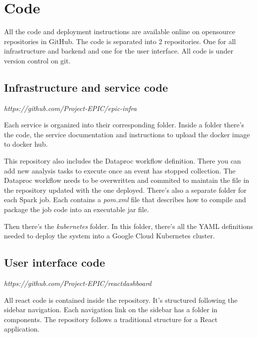 \chapter{Code}	%

All the code and deployment instructions are available online on opensource repositories in GitHub. The code is separated into 2 repositories. One for all infrastructure and backend and one for the user interface. All code is under version control on git. 

\section{Infrastructure and service code}

\textit{https://github.com/Project-EPIC/epic-infra}

Each service is organized into their corresponding folder. Inside a folder there's the code, the service documentation and instructions to upload the docker image to docker hub.

This repository also includes the Dataproc workflow definition. There you can add new analysis tasks to execute once an event has stopped collection. The Dataproc workflow needs to be overwritten and commited to maintain the file in the repository updated with the one deployed. There's also a separate folder for each Spark job. Each contains a \textit{pom.xml} file that describes how to compile and package the job code into an executable jar file.

Then there's the \textit{kubernetes} folder. In this folder, there's all the YAML definitions needed to deploy the system into a Google Cloud Kubernetes cluster. 

\section{User interface code}

\textit{https://github.com/Project-EPIC/reactdashboard}

All react code is contained inside the repository. It's structured following the sidebar navigation. Each navigation link on the sidebar has a folder in components. The repository follows a traditional structure for a React application.